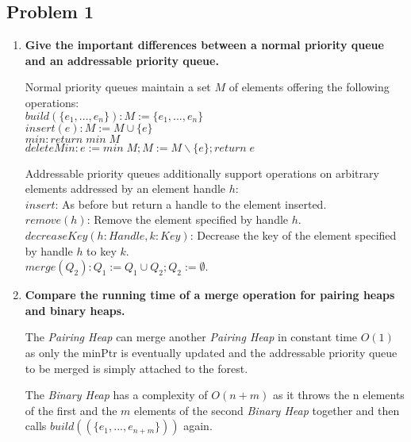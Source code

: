 \subsection{Problem 1}

\begin{enumerate}
    \item \textbf{Give the important differences between a normal priority queue and an addressable priority queue.}
    
    Normal priority queues maintain a set $M$ of elements offering the following operations: \\
    $build(\{e_1,...,e_n\}): M := \{e_1,...,e_n\}$ \\
    $insert(e): M := M \cup \{e\}$ \\
    $min: return \; min \; M$ \\
    $deleteMin: e := min \; M; M := M \backslash \{e\}; return \; e$

    Addressable priority queues additionally support operations on arbitrary elements addressed by an element handle $h$: \\
    $insert$: As before but return a handle to the element inserted. \\
    $remove(h)$: Remove the element specified by handle $h$. \\
    $decreaseKey(h: Handle, k: Key)$: Decrease the key of the element specified by handle $h$ to key $k$. \\
    $merge(Q_2): Q_1:= Q_1 \cup Q_2; Q_2 := \emptyset$.

    \item \textbf{Compare the running time of a merge operation for pairing heaps and binary heaps.}
    
    The \textit{Pairing Heap} can merge another \textit{Pairing Heap} in constant time $O(1)$ as only the minPtr is eventually updated and the addressable priority queue to be merged is simply attached to the forest.
    
    The \textit{Binary Heap} has a complexity of $O(n+m)$ as it throws the n elements of the first and the $m$ elements of the second \textit{Binary Heap} together and then calls $build((\{e_1,...,e_{n+m}\}))$ again.
   
\end{enumerate}
